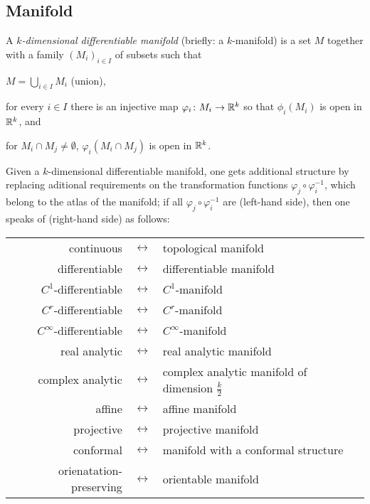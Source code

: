 \documentclass[../main.tex]{subfiles}
\begin{document}
\subsection{Manifold}
\begin{definition}\label{Manifold}
A \textit{\(k\)-dimensional differentiable manifold} (briefly: a \(k\)-manifold)
is a set \(M\) together with a family \(\left(M_i\right)_{i\in I}\) of subsets such that
\begin{APAenumerate}
\item \(M=\bigcup_{i\in I} M_i\) (union),
\item for every \(i\in I\) there is an injective map \(\varphi_i\colon M_i\to\mathbb{R}^k\) so that \(\phi_i\left(M_i\right)\) is open in \(\mathbb{R}^k\), and
\item for \(M_i\cap M_j\ne\emptyset\), \(\varphi_i\left(M_i\cap M_j\right)\) is open in \(\mathbb{R}^k\).
\end{APAenumerate}
\end{definition}
\begin{definition}\label{Manifold:Extended}
Given a \(k\)-dimensional differentiable manifold,
one gets additional structure
by replacing aditional requirements on the transformation functions \(\varphi_j\circ\varphi_i^{-1}\),
which belong to the atlas of the manifold;
if all \(\varphi_j\circ\varphi_i^{-1}\) are (left-hand side),
then one speaks of (right-hand side) as follows:
\begin{center}
\begin{tabular}{ r c l }
continuous&\(\leftrightarrow\)&topological manifold                                 \\
differentiable&\(\leftrightarrow\)&differentiable manifold                              \\
\(C^1\)-differentiable&\(\leftrightarrow\)&\(C^1\)-manifold                                       \\
\(C^r\)-differentiable&\(\leftrightarrow\)&\(C^r\)-manifold                                       \\
\(C^\infty\)-differentiable&\(\leftrightarrow\)&\(C^\infty\)-manifold                                  \\
real analytic&\(\leftrightarrow\)&real analytic manifold                               \\
complex analytic&\(\leftrightarrow\)&complex analytic manifold of dimension \(\frac{k}{2}\) \\
affine&\(\leftrightarrow\)&affine manifold                                      \\
projective&\(\leftrightarrow\)&projective manifold                                  \\
conformal&\(\leftrightarrow\)&manifold with a conformal structure                  \\
orienatation-preserving&\(\leftrightarrow\)&orientable manifold                                  \\
\end{tabular}
\end{center}
\end{definition}
\end{document}
